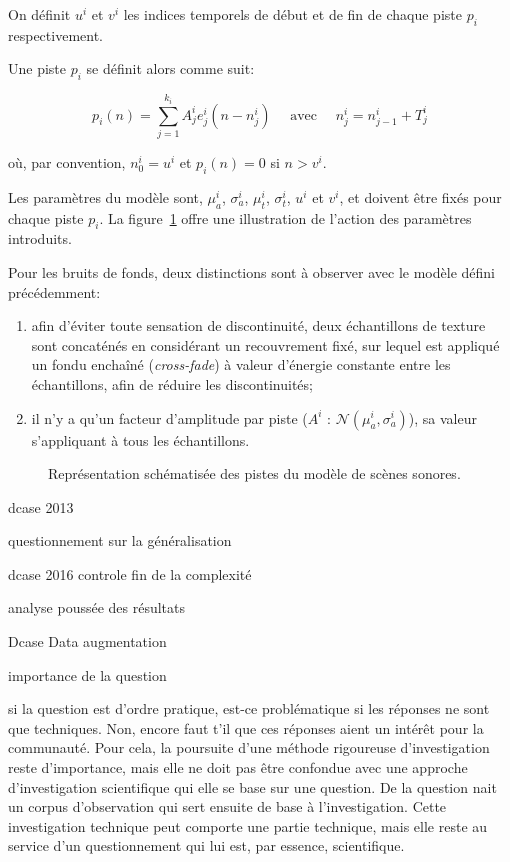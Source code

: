 On définit $u^i$ et $v^i$ les indices temporels de début et de fin de chaque piste $p_i$ respectivement.

Une piste $p_i$ se définit alors comme suit:

\begin{equation}
\label{eq:ch4_eq2}
p_{i}(n)= \sum_{j=1}^{k_i} A_j^i e_j^i(n-n_j^i) \quad \textrm{ avec } \quad n_j^i=n_{j-1}^i + T_j^i
\end{equation}

où, par convention, $n^i_0=u^i$ et $p_i(n)=0$ si $n>v^i$.

Les paramètres du modèle sont, $\mu_a^i$, $\sigma_a^i$, $\mu_t^i$, $\sigma_t^i$, $u^i$ et $v^i$, et doivent être fixés pour chaque piste $p_i$. La figure~\ref{fig:modelSequence} offre une illustration de l'action des paramètres introduits.

Pour les bruits de fonds, deux distinctions sont à observer avec le modèle défini précédemment:

\begin{enumerate}
\item afin d'éviter toute sensation de discontinuité, deux échantillons de texture sont concaténés en considérant un recouvrement fixé, sur lequel est appliqué un fondu enchaîné (\emph{cross-fade}) à valeur d'énergie constante entre les échantillons, afin de réduire les discontinuités;
\item il n'y a qu'un facteur d'amplitude par piste ($A^i \textrm{ : } \mathcal{N}(\mu_a^{i},\sigma_a^{i})$), sa valeur s'appliquant à tous les échantillons.
\end{enumerate}

\begin{figure}[t]
        \graphicspath{{figures/}}
        \def\svgwidth{\linewidth}
        
       \caption{Représentation schématisée des pistes du modèle de scènes sonores.}\label{fig:modelSequence}
\end{figure}

dcase 2013 \cite{stowellhal-01253912}

questionnement sur la généralisation \cite{lafayhal-01111381}

dcase 2016 controle fin de la complexité

analyse poussée des résultats \cite{lafayhal-01635414}

Dcase  \cite{mesa} Data augmentation

importance de la question

si la question est d'ordre pratique, est-ce problématique si les réponses ne sont que techniques. Non, encore faut t'il que ces réponses aient un intérêt pour la communauté. Pour cela, la poursuite d'une méthode rigoureuse d'investigation reste d'importance, mais elle ne doit pas être confondue avec une approche d'investigation scientifique qui elle se base sur une question. De la question nait un corpus d'observation qui sert ensuite de base à l'investigation. Cette investigation technique peut comporte une partie technique, mais elle reste au service d'un questionnement qui lui est, par essence, scientifique.

